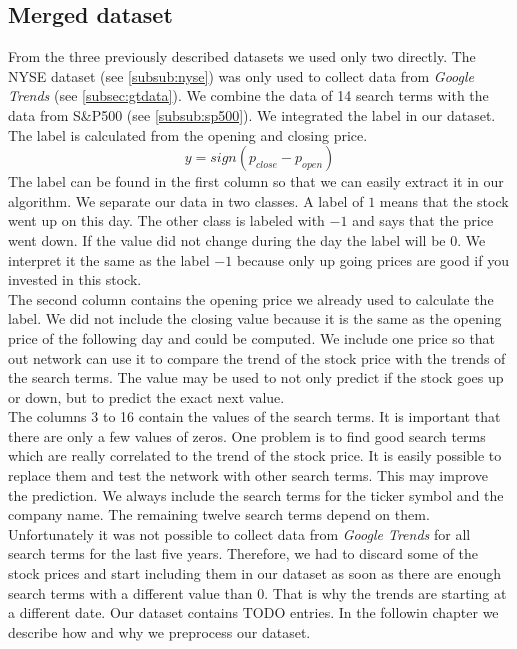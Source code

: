 \subsection{Merged dataset}
\label{subsec:merged}
From the three previously described datasets we used only two directly. The NYSE dataset (see \ref{subsub:nyse}) was only used to collect data from \textit{Google Trends} (see \ref{subsec:gtdata}). We combine the data of 14 search terms with the data from S\&P500 (see \ref{subsub:sp500}). We integrated the label in our dataset. The label is calculated from the opening and closing price.
\begin{equation}
y = sign(p_{close} - p_{open})
\end{equation}
The label can be found in the first column so that we can easily extract it in our algorithm. We separate our data in two classes. A label of $1$ means that the stock went up on this day. The other class is labeled with $-1$ and says that the price went down. If the value did not change during the day the label will be $0$. We interpret it the same as the label $-1$ because only up going prices are good if you invested in this stock.\\
The second column contains the opening price we already used to calculate the label. We did not include the closing value because it is the same as the opening price of the following day and could be computed. We include one price so that out network can use it to compare the trend of the stock price with the trends of the search terms. The value may be used to not only predict if the stock goes up or down, but to predict the exact next value.\\
The columns 3 to 16 contain the values of the search terms. It is important that there are only a few values of zeros. One problem is to find good search terms which are really correlated to the trend of the stock price. It is easily possible to replace them and test the network with other search terms. This may improve the prediction. We always include the search terms for the ticker symbol and the company name. The remaining twelve search terms depend on them.\\
Unfortunately it was not possible to collect data from \textit{Google Trends} for all search terms for the last five years. Therefore, we had to discard some of the stock prices and start including them in our dataset as soon as there are enough search terms with a different value than $0$. That is why the trends are starting at a different date.
Our dataset contains $\text{TODO}$ entries. In the followin chapter we describe how and why we preprocess our dataset.

